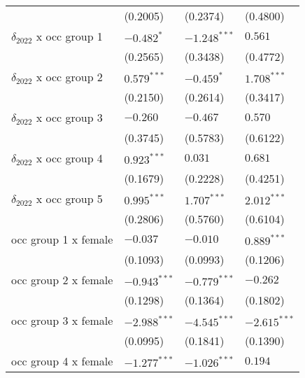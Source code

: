 \begin{tabular}{llll}
                                       &           (0.2005) &           (0.2374) &           (0.4800) \\
$\delta_{2022}$ x occ group 1          &         $-0.482^*$ &     $-1.248^{***}$ &            $0.561$ \\
                                       &           (0.2565) &           (0.3438) &           (0.4772) \\
$\delta_{2022}$ x occ group 2          &      $0.579^{***}$ &         $-0.459^*$ &      $1.708^{***}$ \\
                                       &           (0.2150) &           (0.2614) &           (0.3417) \\
$\delta_{2022}$ x occ group 3          &           $-0.260$ &           $-0.467$ &            $0.570$ \\
                                       &           (0.3745) &           (0.5783) &           (0.6122) \\
$\delta_{2022}$ x occ group 4          &      $0.923^{***}$ &            $0.031$ &            $0.681$ \\
                                       &           (0.1679) &           (0.2228) &           (0.4251) \\
$\delta_{2022}$ x occ group 5          &      $0.995^{***}$ &      $1.707^{***}$ &      $2.012^{***}$ \\
                                       &           (0.2806) &           (0.5760) &           (0.6104) \\
occ group 1 x female                   &           $-0.037$ &           $-0.010$ &      $0.889^{***}$ \\
                                       &           (0.1093) &           (0.0993) &           (0.1206) \\
occ group 2 x female                   &     $-0.943^{***}$ &     $-0.779^{***}$ &           $-0.262$ \\
                                       &           (0.1298) &           (0.1364) &           (0.1802) \\
occ group 3 x female                   &     $-2.988^{***}$ &     $-4.545^{***}$ &     $-2.615^{***}$ \\
                                       &           (0.0995) &           (0.1841) &           (0.1390) \\
occ group 4 x female                   &     $-1.277^{***}$ &     $-1.026^{***}$ &            $0.194$ \\

\end{tabular}
